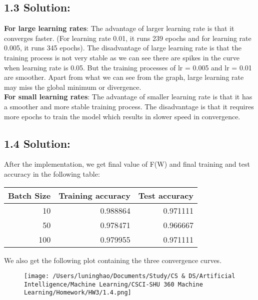 \documentclass{article}
\begin{document}
\subsection*{1.3 Solution:}
\textbf{For large learning rates}: The advantage of larger learning rate is that it converges faster. (For learning rate 0.01, it runs 239 epochs and for learning rate 0.005, it runs 345 epochs).
The disadvantage of large learning rate is that the training process is not very stable as we can see there are spikes in the curve when learning rate is 0.05. But the training processes of lr = 0.005 and lr = 0.01 are smoother. Apart from what we can see from the graph, large learning rate may miss the global minimum or divergence. \\
\textbf{For small learning rates}: The advantage of smaller learning rate is that it has a smoother and more stable training process. The disadvantage is that it requires more epochs to train the model which results in slower speed in convergence.


\subsection*{1.4 Solution:}
After the implementation, we get final value of F(W) and final training and test accuracy in the following table:    
\begin{center}
\begin{tabular}{rrr}
    \toprule
     Batch Size &  Training accuracy &  Test accuracy \\
    \midrule
             10 &            0.988864 &        0.971111 \\
             50 &            0.978471 &        0.966667 \\
            100 &            0.979955 &        0.971111 \\
    \bottomrule
    \end{tabular}
    \end{center}
We also get the following plot containing the three convergence curves.
\begin{figure}[h]
    \centering
    \texttt{[image: /Users/luninghao/Documents/Study/CS \& DS/Artificial Intelligence/Machine Learning/CSCI-SHU 360 Machine Learning/Homework/HW3/1.4.png]}
\end{figure}


\newpage
\end{document}
